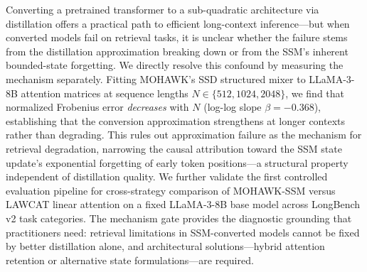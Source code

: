 Converting a pretrained transformer to a sub-quadratic architecture via distillation offers a
practical path to efficient long-context inference---but when converted models fail on retrieval
tasks, it is unclear whether the failure stems from the distillation approximation breaking down
or from the SSM's inherent bounded-state forgetting. We directly resolve this confound by
measuring the mechanism separately. Fitting MOHAWK's SSD structured mixer to LLaMA-3-8B attention
matrices at sequence lengths $N \in \{512, 1024, 2048\}$, we find that normalized Frobenius error
\emph{decreases} with $N$ (log-log slope $\beta=-0.368$), establishing that the conversion
approximation strengthens at longer contexts rather than degrading. This rules out approximation
failure as the mechanism for retrieval degradation, narrowing the causal attribution toward the
SSM state update's exponential forgetting of early token positions---a structural property
independent of distillation quality. We further validate the first controlled evaluation pipeline
for cross-strategy comparison of MOHAWK-SSM versus LAWCAT linear attention on a fixed LLaMA-3-8B
base model across LongBench v2 task categories. The mechanism gate provides the diagnostic
grounding that practitioners need: retrieval limitations in SSM-converted models cannot be fixed
by better distillation alone, and architectural solutions---hybrid attention retention or
alternative state formulations---are required.
